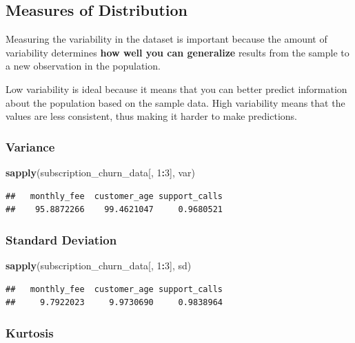 \documentclass[
]{article}
\newenvironment{Shaded}{\begin{snugshade}}{\end{snugshade}}
\newcommand{\DecValTok}[1]{\textcolor[rgb]{0.00,0.00,0.81}{#1}}
\newcommand{\FunctionTok}[1]{\textcolor[rgb]{0.13,0.29,0.53}{\textbf{#1}}}
\newcommand{\NormalTok}[1]{#1}
\newcommand{\SpecialCharTok}[1]{\textcolor[rgb]{0.81,0.36,0.00}{\textbf{#1}}}
\begin{document}
\subsection{Measures of Distribution}\label{measures-of-distribution}

Measuring the variability in the dataset is important because the amount
of variability determines \textbf{how well you can generalize} results
from the sample to a new observation in the population.

Low variability is ideal because it means that you can better predict
information about the population based on the sample data. High
variability means that the values are less consistent, thus making it
harder to make predictions.

\subsubsection{Variance}\label{variance}

\begin{Shaded}
\begin{Highlighting}[]
\FunctionTok{sapply}\NormalTok{(subscription\_churn\_data[, }\DecValTok{1}\SpecialCharTok{:}\DecValTok{3}\NormalTok{], var)}
\end{Highlighting}
\end{Shaded}

\begin{verbatim}
##   monthly_fee  customer_age support_calls 
##    95.8872266    99.4621047     0.9680521
\end{verbatim}

\subsubsection{Standard Deviation}\label{standard-deviation}

\begin{Shaded}
\begin{Highlighting}[]
\FunctionTok{sapply}\NormalTok{(subscription\_churn\_data[, }\DecValTok{1}\SpecialCharTok{:}\DecValTok{3}\NormalTok{], sd)}
\end{Highlighting}
\end{Shaded}

\begin{verbatim}
##   monthly_fee  customer_age support_calls 
##     9.7922023     9.9730690     0.9838964
\end{verbatim}

\subsubsection{Kurtosis}\label{kurtosis}
\end{document}
